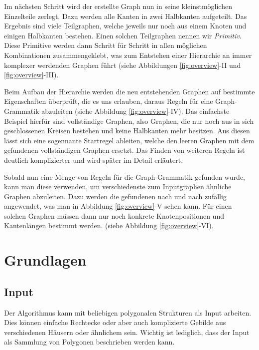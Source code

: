 Im nächsten Schritt wird der erstellte Graph nun in seine kleinstmöglichen Einzelteile zerlegt. Dazu werden alle Kanten in zwei Halbkanten
aufgeteilt. Das Ergebnis sind viele Teilgraphen, welche jeweils nur noch aus einem Knoten und einigen Halbkanten bestehen.
Einen solchen Teilgraphen nennen wir \textit{Primitiv}. Diese Primitive werden dann Schritt für Schritt in allen möglichen Kombinationen
zusammengeklebt, was zum Entstehen einer Hierarchie an immer komplexer werdenden Graphen führt (siehe Abbildungen \ref{fig:overview}-II und
\ref{fig:overview}-III).

Beim Aufbau der Hierarchie werden die neu entstehenden Graphen auf bestimmte
Eigenschaften überprüft, die es uns erlauben, daraus Regeln für eine Graph-Grammatik abzuleiten (siehe Abbildung \ref{fig:overview}-IV).
Das einfachste Beispiel hierfür sind
vollständige Graphen, also Graphen, die nur noch aus in sich geschlossenen Kreisen bestehen und keine Halbkanten mehr besitzen. Aus diesen lässt
sich eine sogennante Startregel ableiten, welche den leeren Graphen mit dem gefundenen vollständigen Graphen ersetzt. Das Finden von weiteren
Regeln ist deutlich komplizierter und wird später im Detail erläutert.

Sobald nun eine Menge von Regeln für die Graph-Grammatik gefunden wurde, kann man diese verwenden, um verschiedenste zum Inputgraphen
ähnliche Graphen abzuleiten. Dazu werden die gefundenen nach und nach zufällig angewendet, was man in Abbildung \ref{fig:overview}-V sehen kann.
Für einen solchen Graphen müssen dann nur noch konkrete Knotenpositionen und Kantenlängen bestimmt werden. (siehe Abbildung \ref{fig:overview}-VI).

\section{Grundlagen}
\subsection{Input}
Der Algorithmus kann mit beliebigen polygonalen Strukturen als Input arbeiten. Dies können einfache Rechtecke oder aber auch komplizierte Gebilde
aus verschiedenen Häusern oder ähnlichem sein. Wichtig ist lediglich, dass der Input als Sammlung von Polygonen beschrieben werden kann.


